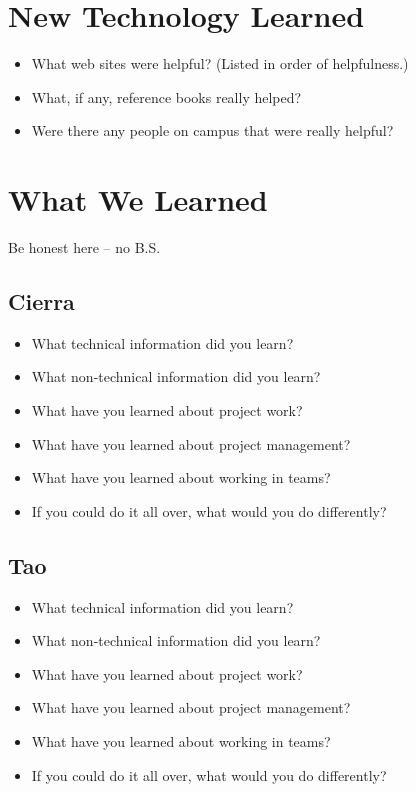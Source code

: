 \documentclass[compsoc,draftclsnofoot,onecolumn,10pt]{IEEEtran}
\begin{document}
\section{New Technology Learned}
\begin{itemize}
    \item What web sites were helpful? (Listed in order of helpfulness.)
    \item What, if any, reference books really helped?
    \item Were there any people on campus that were really helpful?
\end{itemize}

\section{What We Learned}
Be honest here -- no B.S.

\subsection{Cierra}
\begin{itemize}
    \item What technical information did you learn?
    \item What non-technical information did you learn?
    \item What have you learned about project work?
    \item What have you learned about project management?
    \item What have you learned about working in teams?
    \item If you could do it all over, what would you do differently?
\end{itemize}

\subsection{Tao}
\begin{itemize}
    \item What technical information did you learn?
    \item What non-technical information did you learn?
    \item What have you learned about project work?
    \item What have you learned about project management?
    \item What have you learned about working in teams?
    \item If you could do it all over, what would you do differently?
\end{itemize}
\end{document}

